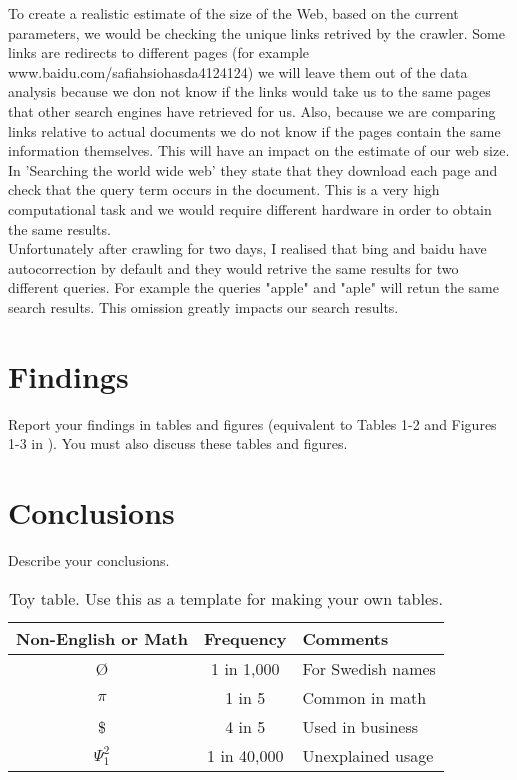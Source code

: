 \documentclass{sig-alternate}
\begin{document}
To create a realistic estimate of the size of the Web, based on the current parameters, we would be checking the unique links retrived by the crawler. Some links are redirects to different pages (for example www.baidu.com/safiahsiohasda4124124) we will leave them out of the data analysis because we don not know if the links would take us to the same pages that other search engines have retrieved for us. Also, because we are comparing links relative to actual documents we do not know if the pages contain the same information themselves. This will have an impact on the estimate of our web size. In 'Searching the world wide web' they state that they download each page and check that the query term occurs in the document. This is a very high computational task and we would require different hardware in order to obtain the same results.\\

Unfortunately after crawling for two days, I realised that bing and baidu have autocorrection by default and they would retrive the same results for two different queries. For example the queries "apple" and "aple" will retun the same search results. This omission greatly impacts our search results.\\

\section{Findings}
Report your findings in tables and figures (equivalent to Tables 1-2 and Figures 1-3 in \cite{LawLee1998}). You must also discuss these tables and figures.


\section{Conclusions}
Describe your conclusions. 

\begin{table}
\centering
\caption{Toy table. Use this as a template for making your own tables.}
\begin{tabular}{|c|c|l|} \hline
Non-English or Math&Frequency&Comments\\ \hline
\O & 1 in 1,000& For Swedish names\\ \hline
$\pi$ & 1 in 5& Common in math\\ \hline
\$ & 4 in 5 & Used in business\\ \hline
$\Psi^2_1$ & 1 in 40,000& Unexplained usage\\
\hline\end{tabular}
\end{table}
\end{document}
